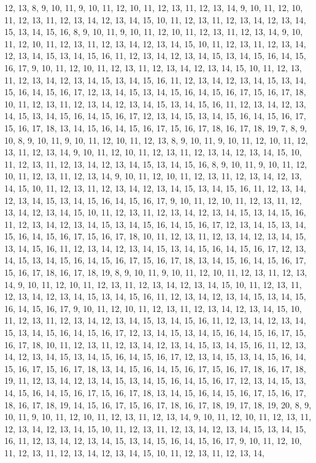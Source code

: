12, 13, 8, 9, 10, 11, 9, 10, 11, 12, 10, 11, 12, 13, 11, 12, 13, 14, 9, 10, 11, 12, 10, 11, 12, 13, 11, 12, 13, 14, 12, 13, 14, 15, 10, 11, 12, 13, 11, 12, 13, 14, 12, 13, 14, 15, 13, 14, 15, 16, 8, 9, 10, 11, 9, 10, 11, 12, 10, 11, 12, 13, 11, 12, 13, 14, 9, 10, 11, 12, 10, 11, 12, 13, 11, 12, 13, 14, 12, 13, 14, 15, 10, 11, 12, 13, 11, 12, 13, 14, 12, 13, 14, 15, 13, 14, 15, 16, 11, 12, 13, 14, 12, 13, 14, 15, 13, 14, 15, 16, 14, 15, 16, 17, 9, 10, 11, 12, 10, 11, 12, 13, 11, 12, 13, 14, 12, 13, 14, 15, 10, 11, 12, 13, 11, 12, 13, 14, 12, 13, 14, 15, 13, 14, 15, 16, 11, 12, 13, 14, 12, 13, 14, 15, 13, 14, 15, 16, 14, 15, 16, 17, 12, 13, 14, 15, 13, 14, 15, 16, 14, 15, 16, 17, 15, 16, 17, 18, 10, 11, 12, 13, 11, 12, 13, 14, 12, 13, 14, 15, 13, 14, 15, 16, 11, 12, 13, 14, 12, 13, 14, 15, 13, 14, 15, 16, 14, 15, 16, 17, 12, 13, 14, 15, 13, 14, 15, 16, 14, 15, 16, 17, 15, 16, 17, 18, 13, 14, 15, 16, 14, 15, 16, 17, 15, 16, 17, 18, 16, 17, 18, 19, 7, 8, 9, 10, 8, 9, 10, 11, 9, 10, 11, 12, 10, 11, 12, 13, 8, 9, 10, 11, 9, 10, 11, 12, 10, 11, 12, 13, 11, 12, 13, 14, 9, 10, 11, 12, 10, 11, 12, 13, 11, 12, 13, 14, 12, 13, 14, 15, 10, 11, 12, 13, 11, 12, 13, 14, 12, 13, 14, 15, 13, 14, 15, 16, 8, 9, 10, 11, 9, 10, 11, 12, 10, 11, 12, 13, 11, 12, 13, 14, 9, 10, 11, 12, 10, 11, 12, 13, 11, 12, 13, 14, 12, 13, 14, 15, 10, 11, 12, 13, 11, 12, 13, 14, 12, 13, 14, 15, 13, 14, 15, 16, 11, 12, 13, 14, 12, 13, 14, 15, 13, 14, 15, 16, 14, 15, 16, 17, 9, 10, 11, 12, 10, 11, 12, 13, 11, 12, 13, 14, 12, 13, 14, 15, 10, 11, 12, 13, 11, 12, 13, 14, 12, 13, 14, 15, 13, 14, 15, 16, 11, 12, 13, 14, 12, 13, 14, 15, 13, 14, 15, 16, 14, 15, 16, 17, 12, 13, 14, 15, 13, 14, 15, 16, 14, 15, 16, 17, 15, 16, 17, 18, 10, 11, 12, 13, 11, 12, 13, 14, 12, 13, 14, 15, 13, 14, 15, 16, 11, 12, 13, 14, 12, 13, 14, 15, 13, 14, 15, 16, 14, 15, 16, 17, 12, 13, 14, 15, 13, 14, 15, 16, 14, 15, 16, 17, 15, 16, 17, 18, 13, 14, 15, 16, 14, 15, 16, 17, 15, 16, 17, 18, 16, 17, 18, 19, 8, 9, 10, 11, 9, 10, 11, 12, 10, 11, 12, 13, 11, 12, 13, 14, 9, 10, 11, 12, 10, 11, 12, 13, 11, 12, 13, 14, 12, 13, 14, 15, 10, 11, 12, 13, 11, 12, 13, 14, 12, 13, 14, 15, 13, 14, 15, 16, 11, 12, 13, 14, 12, 13, 14, 15, 13, 14, 15, 16, 14, 15, 16, 17, 9, 10, 11, 12, 10, 11, 12, 13, 11, 12, 13, 14, 12, 13, 14, 15, 10, 11, 12, 13, 11, 12, 13, 14, 12, 13, 14, 15, 13, 14, 15, 16, 11, 12, 13, 14, 12, 13, 14, 15, 13, 14, 15, 16, 14, 15, 16, 17, 12, 13, 14, 15, 13, 14, 15, 16, 14, 15, 16, 17, 15, 16, 17, 18, 10, 11, 12, 13, 11, 12, 13, 14, 12, 13, 14, 15, 13, 14, 15, 16, 11, 12, 13, 14, 12, 13, 14, 15, 13, 14, 15, 16, 14, 15, 16, 17, 12, 13, 14, 15, 13, 14, 15, 16, 14, 15, 16, 17, 15, 16, 17, 18, 13, 14, 15, 16, 14, 15, 16, 17, 15, 16, 17, 18, 16, 17, 18, 19, 11, 12, 13, 14, 12, 13, 14, 15, 13, 14, 15, 16, 14, 15, 16, 17, 12, 13, 14, 15, 13, 14, 15, 16, 14, 15, 16, 17, 15, 16, 17, 18, 13, 14, 15, 16, 14, 15, 16, 17, 15, 16, 17, 18, 16, 17, 18, 19, 14, 15, 16, 17, 15, 16, 17, 18, 16, 17, 18, 19, 17, 18, 19, 20, 8, 9, 10, 11, 9, 10, 11, 12, 10, 11, 12, 13, 11, 12, 13, 14, 9, 10, 11, 12, 10, 11, 12, 13, 11, 12, 13, 14, 12, 13, 14, 15, 10, 11, 12, 13, 11, 12, 13, 14, 12, 13, 14, 15, 13, 14, 15, 16, 11, 12, 13, 14, 12, 13, 14, 15, 13, 14, 15, 16, 14, 15, 16, 17, 9, 10, 11, 12, 10, 11, 12, 13, 11, 12, 13, 14, 12, 13, 14, 15, 10, 11, 12, 13, 11, 12, 13, 14, 